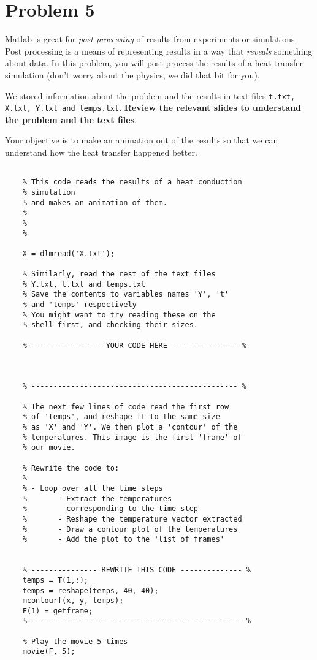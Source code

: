 \documentclass{article}
\begin{document}
\section*{Problem 5}

Matlab is great for \emph{post processing} of results from experiments
or simulations. Post processing is a means of representing results in
a way that \emph{reveals} something about data. In this problem, you
will post process the results of a heat transfer simulation (don't worry
about the physics, we did that bit for you).

We stored information about the problem and the results in text 
files \texttt{t.txt, X.txt, Y.txt and temps.txt}. \textbf{Review the relevant
slides to understand the problem and the text files}.

Your objective is to make an animation out of the results so that
we can understand how the heat transfer happened better.


\begin{verbatim}
                                           
    % This code reads the results of a heat conduction 
    % simulation
    % and makes an animation of them.
    %  
    % 
    %

    X = dlmread('X.txt');

    % Similarly, read the rest of the text files
    % Y.txt, t.txt and temps.txt
    % Save the contents to variables names 'Y', 't' 
    % and 'temps' respectively
    % You might want to try reading these on the
    % shell first, and checking their sizes.

    % ---------------- YOUR CODE HERE --------------- %



    % ----------------------------------------------- %

    % The next few lines of code read the first row
    % of 'temps', and reshape it to the same size
    % as 'X' and 'Y'. We then plot a 'contour' of the
    % temperatures. This image is the first 'frame' of
    % our movie.

    % Rewrite the code to:
    %
    % - Loop over all the time steps
    %       - Extract the temperatures 
    %         corresponding to the time step
    %       - Reshape the temperature vector extracted
    %       - Draw a contour plot of the temperatures
    %       - Add the plot to the 'list of frames'


    % --------------- REWRITE THIS CODE -------------- %
    temps = T(1,:);
    temps = reshape(temps, 40, 40);
    mcontourf(x, y, temps);
    F(1) = getframe;
    % ------------------------------------------------ %

    % Play the movie 5 times
    movie(F, 5);


\end{verbatim}
\end{document}

